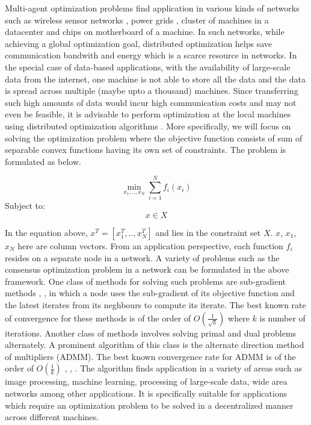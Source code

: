 \documentclass[letterpaper, 10 pt, conference]{ieeeconf}  %
\begin{document}
Multi-agent optimization problems find application in various kinds of networks such as wireless sensor networks \cite{schizas2008consensus}, power grids \cite{nabavidistributed}, cluster of machines in a datacenter \cite{xu2013joint} and chips on motherboard of a machine. In such networks, while achieving a global optimization goal, distributed optimization helps save communication bandwith and energy which is a scarce resource in networks. In the special case of data-based applications, with the availability of large-scale data from the internet, one machine is not able to store all the data and the data is spread across multiple (maybe upto a thousand) machines. Since transferring such high amounts of data would incur high communication costs and may not even be feasible, it is advisable to perform optimization at the local machines using distributed optimization algorithms \cite{bertsekas1989parallel}. More specifically, we will focus on solving the optimization problem where the objective function consists of sum of separable convex functions having its own set of constraints. The problem is formulated as below.

\begin{equation} \label{dist_opt}
\min_{x_1, .., x_N} \sum_{i=1}^{N} f_i(x_i)
\end{equation}
Subject to:
\begin{equation}  
x \in X
\end{equation}

In the equation above, $x^T = [x_{1}^T, .., x_{N}^T]$ and lies in the constraint set $X$. $x$, $x_1$, $x_N$ here are column vectors. From an application perspective, each function $f_i$ resides on a separate node in a network.  A variety of problems such as the consensus optimization problem in a network can be formulated in the above framework. One class of methods for solving such problems are sub-gradient methods \cite{ram2010distributed}, \cite{johansson2008subgradient}, \cite{nedic2009distributed} in which a node uses the sub-gradient of its objective function and the latest iterates from its neghbours to compute its iterate. The best known rate of convergence for these methods is of the order of $O\left(\frac{1}{\sqrt{k}}\right)$ \cite{lobel2008convergence} where $k$ is number of iterations. Another class of methods involves solving primal and dual problems alternately. A prominent algorithm of this class is the alternate direction method of multipliers (ADMM). The best known convergence rate for ADMM is of the order of $O\left(\frac{1}{k}\right)$ \cite{boyd2011distributed}, \cite{he20121}, \cite{wei2012distributed}. The algorithm finds application in a variety of areas such as image processing, machine learning, processing of large-scale data, wide area networks among other applications. It is specifically suitable for applications which require an optimization problem to be solved in a decentralized manner across different machines.
\end{document}
